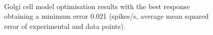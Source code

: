 \begin{figure}[htb]
  \centering %
   \\
  \caption{Golgi cell model optimisation results with the best response obtaining a minimum error 0.021 (spikes/s, average mean squared error of experimental and data points). }\label{fig:GolgiResult}
\end{figure}











